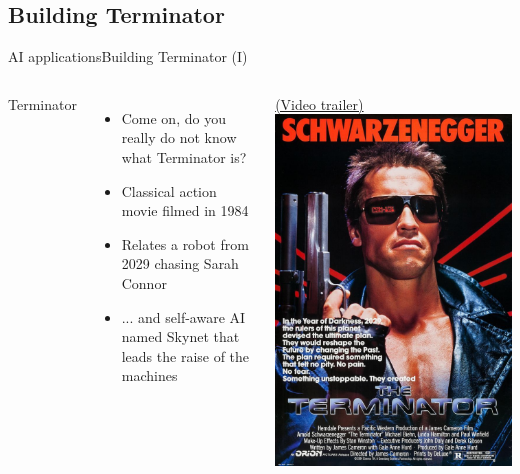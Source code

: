 \documentclass[10pt,compress]{beamer} %
\begin{document}
\subsection{Building Terminator}

\begin{frame}{AI applications}{Building Terminator (I)}
	\begin{columns}
			Terminator
			\begin{itemize}
            \item Come on, do you really do not know what Terminator is?
			\item Classical action movie filmed in 1984
			\item Relates a robot from 2029 chasing Sarah Connor
            \item ... and self-aware AI named Skynet that leads the raise of the machines
			\end{itemize}
			\href{https://www.youtube.com/watch?v=k64P4l2Wmeg}{(Video trailer)}
		\includegraphics[width=\linewidth]{figs/terminator.jpg}\\
	\end{columns}
\end{frame}
\end{document}
